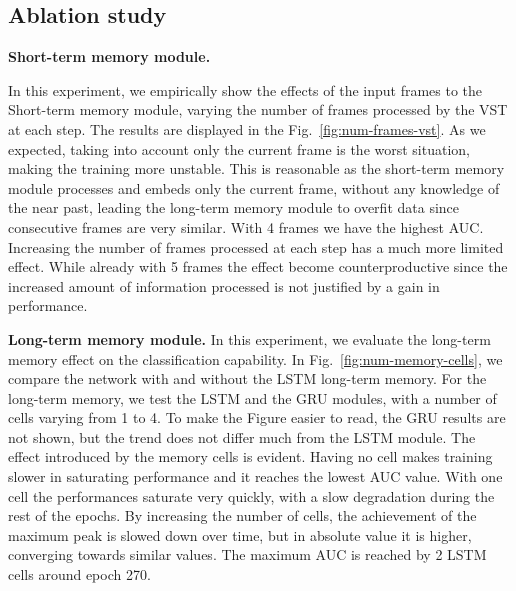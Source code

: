 \subsection{Ablation study}


\noindent\textbf{Short-term memory module.}

In this experiment, we empirically show the effects of the input frames to the Short-term memory module, varying the number of frames processed by the VST at each step.
The results are displayed in the Fig.~\ref{fig:num-frames-vst}.
As we expected, taking into account only the current frame is the worst situation, making the training more unstable.
This is reasonable as the short-term memory module processes and embeds only the current frame, without any knowledge of the near past, leading the
long-term memory module to overfit data since consecutive frames are very similar. 
With 4 frames we have the highest AUC.
Increasing the number of frames processed at each step has a much more limited effect.
While already with 5 frames the effect become counterproductive since the increased amount of information processed is not justified by a gain in performance.


\noindent\textbf{Long-term memory module.}
In this experiment, we evaluate the long-term memory effect on the classification capability.
In Fig.~\ref{fig:num-memory-cells}, we compare the network with and without the LSTM long-term memory.
For the long-term memory, we test the LSTM and the GRU \cite{chung2014empirical} modules, with a number of cells varying from 1 to 4.
To make the Figure easier to read, the GRU results are not shown, but the trend does not differ much from the LSTM module. 
The effect introduced by the memory cells is evident.
Having no cell makes training slower in saturating performance and it reaches the lowest AUC value.
With one cell the performances saturate very quickly, with a slow degradation during the rest of the epochs.
By increasing the number of cells, the achievement of the maximum peak is slowed down over time, but in absolute value it is higher, converging towards similar values.
The maximum AUC is reached by 2 LSTM cells around epoch 270.

